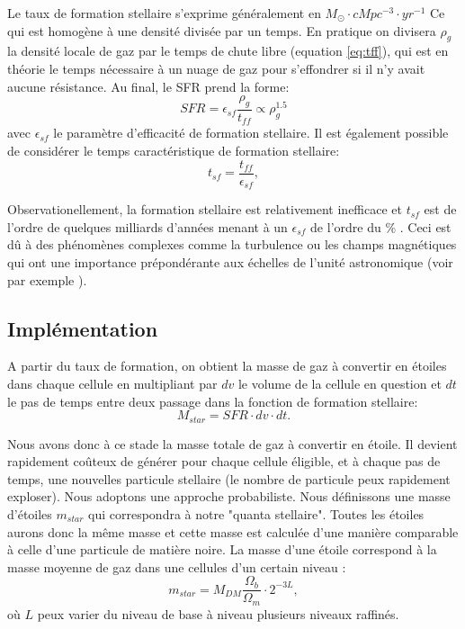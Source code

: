 Le taux de formation stellaire s'exprime généralement en $M_\odot \cdot cMpc^{-3} \cdot yr^{-1}$  
Ce qui est homogène à une densité divisée par un temps.
En pratique on divisera $\rho_g$ la densité locale de gaz par le temps de chute libre (equation \ref{eq:tff}), qui est en théorie le temps nécessaire à un nuage de gaz pour s'effondrer si il n'y avait aucune résistance.
Au final, le \ac{SFR} prend la forme:
\begin{equation}
	SFR = \epsilon_{sf} \frac{\rho_g}{t_{ff}} \propto \rho_g^{1.5}
    \label{eq_sfr}
\end{equation}
avec  $\epsilon_{sf}$ le paramètre d'efficacité de formation stellaire.
Il est également possible de considérer le temps caractéristique de formation stellaire:
\begin{equation}
t_{sf} =  \frac{t_{ff}}{\epsilon_{sf}},
\end{equation}


Observationellement, la formation stellaire est relativement inefficace et $t_{sf}$ est de l'ordre de quelques milliards d'années menant à un $\epsilon_{sf}$ de l'ordre du \% \citep{krumholz_universal_2012}.
Ceci est dû à des phénomènes complexes comme la turbulence ou les champs magnétiques qui ont une importance prépondérante aux échelles de l'unité astronomique (voir par exemple \cite{2015MNRAS.450.4035F}).


\subsection{Implémentation}

A partir du taux de formation, on obtient la masse de gaz à convertir en étoiles dans chaque cellule en multipliant par $dv$ le volume de la cellule en question et $dt$ le pas de temps entre deux passage dans la fonction de formation stellaire:
\begin{equation}
	M_{star} = SFR \cdot dv \cdot dt .
\end{equation}

Nous avons donc à ce stade la masse totale de gaz à convertir en étoile.
Il devient rapidement coûteux de générer pour chaque cellule éligible, et à chaque pas de temps, une nouvelles particule stellaire (le nombre de particule peux rapidement exploser).
Nous adoptons une approche probabiliste.
Nous définissons une masse d'étoiles $m_{star}$ qui correspondra à notre "quanta stellaire".
Toutes les étoiles aurons donc la même masse et cette masse est calculée d'une manière comparable à celle d'une particule de matière noire.
La masse d'une étoile correspond à la masse moyenne de gaz dans une cellules d'un certain niveau :
\begin{equation}
 m_{star} = M_{DM} \frac{\Omega_b}{\Omega_m}\cdot 2^{-3L},
\end{equation}
où $L$ peux varier du niveau de base à niveau plusieurs niveaux raffinés.

